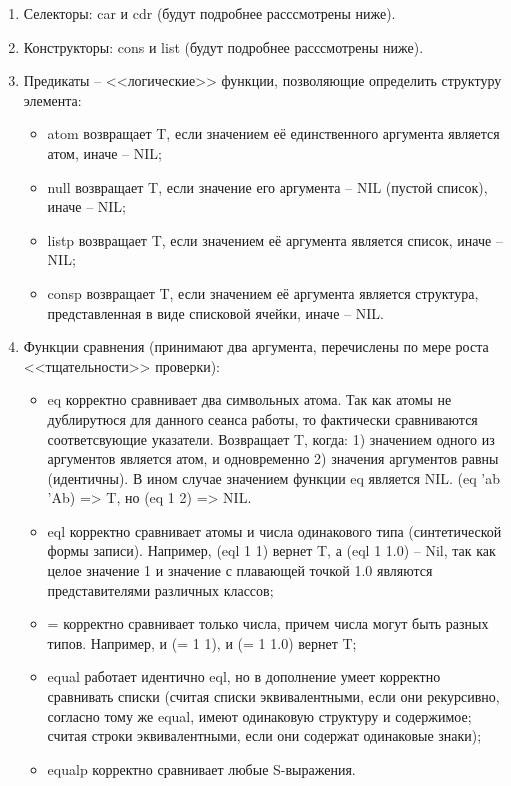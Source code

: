 \documentclass[12pt]{report}
\begin{document}
	\begin{enumerate}
		\item Селекторы: car и cdr (будут подробнее расссмотрены ниже).
		\item Конструкторы: cons и list (будут подробнее расссмотрены ниже).
		\item Предикаты -- <<логические>> функции, позволяющие определить структуру элемента:
		\begin{itemize}
			\item atom возвращает T, если значением её единственного аргумента является атом, иначе -- NIL;
			\item null возвращает T, если значение его аргумента -- NIL (пустой список), иначе -- NIL;
			\item listp возвращает T, если значением её аргумента является список, иначе -- NIL;
			\item consp возвращает T, если значением её аргумента является структура, представленная в виде списковой ячейки, иначе -- NIL. 
		\end{itemize}
		\item Функции сравнения (принимают два аргумента, перечислены по мере роста <<тщательности>> проверки):
		\begin{itemize}
			\item eq корректно сравнивает два символьных атома. Так как атомы не дублирутюся для данного сеанса работы, то фактически сравниваются соответсвующие указатели. 
			Возвращает T, когда: 1) значением одного из аргументов является атом, и одновременно 2) значения аргументов равны (идентичны). В ином случае значением функции eq является NIL. (eq  'ab 'Ab) => T, но (eq 1 2) => NIL.
			\item eql корректно сравнивает атомы и числа одинакового типа (синтетической формы записи). Например, (eql 1 1) вернет T, а (eql 1 1.0) -- Nil, так как целое значение 1 и значение с плавающей точкой 1.0 являются представителями различных классов;
			\item = корректно сравнивает только числа, причем числа могут быть разных типов. Например, и (= 1 1), и (= 1 1.0) вернет T;
			\item equal работает идентично eql, но в дополнение умеет корректно сравнивать списки (считая списки эквивалентными, если они рекурсивно, согласно тому же equal, имеют одинаковую структуру и содержимое; считая строки эквивалентными, если они содержат одинаковые знаки);
			\item equalp корректно сравнивает любые S-выражения. 
		\end{itemize}
	\end{enumerate}
	
\end{document}

